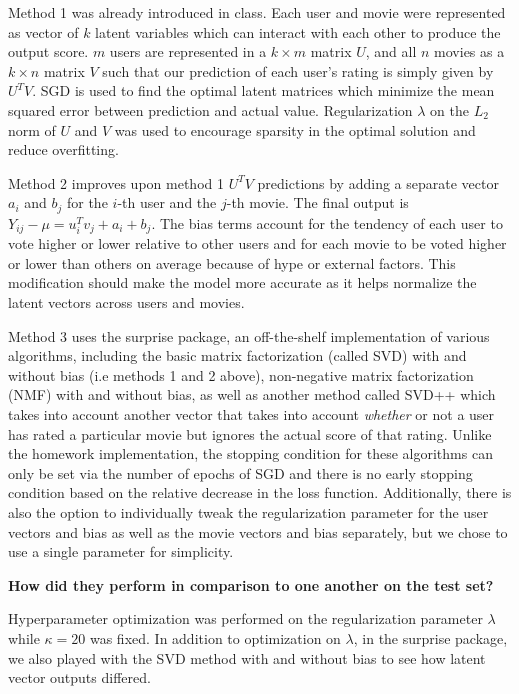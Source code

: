 Method 1 was already introduced in class. Each user and movie were represented as vector of $k$ latent variables which can interact with each other to produce the output score. $m$ users are represented in a $k\times m$ matrix $U$, and all $n$ movies as a $k\times n$ matrix $V$ such that our prediction of each user's rating is simply given by $U^T V$. SGD is used to find the optimal latent matrices which minimize the mean squared error between prediction and actual value. Regularization $\lambda$ on the $L_2$ norm of $U$ and $V$ was used to encourage sparsity in the optimal solution and reduce overfitting. \newline

Method 2 improves upon method 1 $U^T V$ predictions by adding a separate vector $a_i$ and $b_j$ for the $i$-th user and the $j$-th movie. The final output is $Y_{ij}-\mu = u_i^Tv_j + a_i + b_j$. The bias terms account for the tendency of each user to vote higher or lower relative to other users and for each movie to be voted higher or lower than others on average because of hype or external factors. This modification should make the model more accurate as it helps normalize the latent vectors across users and movies. \newline

Method 3 uses the surprise package, an off-the-shelf implementation of various algorithms, including the basic matrix factorization (called SVD) with and without bias (i.e methods 1 and 2 above), non-negative matrix factorization (NMF) with and without bias, as well as another method called SVD++ which takes into account another vector that takes into account \textit{whether} or not a user has rated a particular movie but ignores the actual score of that rating. Unlike the homework implementation, the stopping condition for these algorithms can only be set via the number of epochs of SGD and there is no early stopping condition based on the relative decrease in the loss function. Additionally, there is also the option to individually tweak the regularization parameter for the user vectors and bias as well as the movie vectors and bias separately, but we chose to use a single parameter for simplicity. \newline

\textbf{How did they perform in comparison to one another on the test set?} \newline

Hyperparameter optimization was performed on the regularization parameter $\lambda$ while $\kappa=20$ was fixed. In addition to optimization on $\lambda$, in the surprise package, we also played with the SVD method with and without bias to see how latent vector outputs differed.

